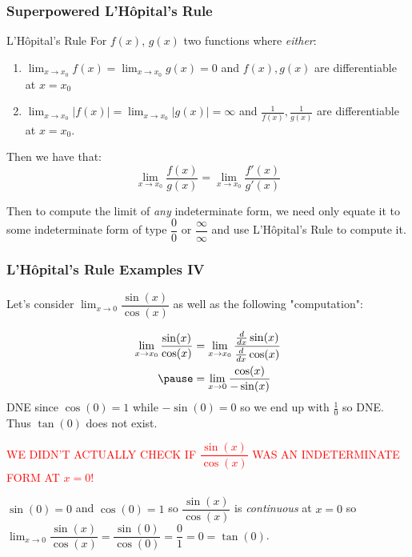 \documentclass{ltx-talk}
\begin{document}
\begin{frame}
  \frametitle{Superpowered L'Hôpital's Rule}

  \begin{alertblock}{L'Hôpital's Rule}
    For $f(x)$, $g(x)$ two functions where \textit{either}:
    \begin{enumerate}
      \item $\lim_{x \rightarrow x_0} f(x) = \lim_{x \rightarrow x_0} g(x) = 0$ and $f(x), g(x)$ are differentiable at $x = x_0$
      \item $\lim_{x \rightarrow x_0} |f(x)| = \lim_{x \rightarrow x_0} |g(x)| = \infty$ and $\frac{1}{f(x)}, \frac{1}{g(x)}$ are differentiable at $x = x_0$.
    \end{enumerate}
    Then we have that:
    \begin{equation}
      \lim_{x \rightarrow x_0} \dfrac{f(x)}{g(x)} = \lim_{x \rightarrow x_0} \dfrac{f'(x)}{g'(x)}
    \end{equation}
  \end{alertblock} \pause

  Then to compute the limit of \textit{any} indeterminate form, we need only
  equate it to some indeterminate form of type $\dfrac{0}{0}$ or $\dfrac{\infty}{\infty}$ and use L'Hôpital's Rule to compute it.
\end{frame}

\begin{frame}
  \frametitle{L'Hôpital's Rule Examples IV}
  Let's consider $\lim_{x \rightarrow 0} \dfrac{\sin(x)}{\cos(x)}$
  as well as the following "computation": \pause

  \begin{align}
    \lim\limits_{x \rightarrow x_0} \dfrac{\sin(x)}{\cos(x)} &= \lim\limits_{x \rightarrow x_0} \dfrac{\frac{d}{dx} \sin(x)}{\frac{d}{dx} \cos(x)} \\ \pause
                                                             &= \lim\limits_{x \rightarrow 0} \dfrac{\cos(x)}{-\sin(x)}
  \end{align}
  DNE since $\cos(0) = 1$ while $-\sin(0) = 0$ so we end up with $\frac{1}{0}$ so DNE. Thus $\tan(0)$ does not exist. \pause

  \textcolor{red}{WE DIDN'T ACTUALLY CHECK IF $\dfrac{\sin(x)}{\cos(x)}$ WAS AN INDETERMINATE FORM AT $x = 0$!} \pause

  $\sin(0) = 0$ and $\cos(0) = 1$ so $\dfrac{\sin(x)}{\cos(x)}$ is \textit{continuous} at $x = 0$ so $\lim_{x \rightarrow 0} \dfrac{\sin(x)}{\cos(x)} = \dfrac{\sin(0)}{\cos(0)} = \dfrac{0}{1} = 0 = \tan(0)$.
\end{frame}
\end{document}
